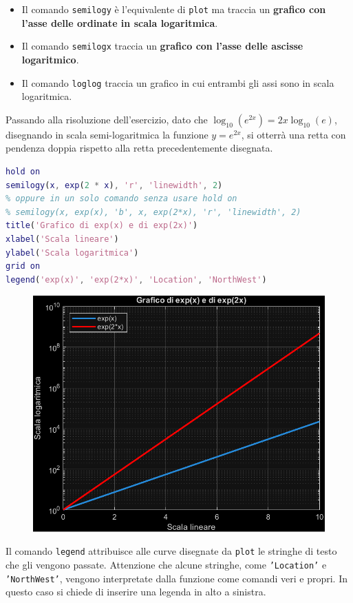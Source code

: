 \begin{itemize}
    \item Il comando \texttt{semilogy} è l'equivalente di \texttt{plot} ma traccia un \textbf{grafico con l'asse delle ordinate in scala logaritmica}.

    \item Il comando \texttt{semilogx} traccia un \textbf{grafico con l'asse delle ascisse logaritmico}.
    
    \item Il comando \texttt{loglog} traccia un grafico in cui entrambi gli assi sono in scala logaritmica.
\end{itemize}
Passando alla risoluzione dell'esercizio, dato che $\log_{10}\left(e^{2x}\right) = 2x\log_{10}\left(e\right)$, disegnando in scala semi-logaritmica la funzione $y = e^{2x}$, si otterrà una retta con pendenza doppia rispetto alla retta precedentemente disegnata.
\begin{lstlisting}[language=MATLAB]
hold on
semilogy(x, exp(2 * x), 'r', 'linewidth', 2)
% oppure in un solo comando senza usare hold on
% semilogy(x, exp(x), 'b', x, exp(2*x), 'r', 'linewidth', 2)
title('Grafico di exp(x) e di exp(2x)')
xlabel('Scala lineare')
ylabel('Scala logaritmica')
grid on
legend('exp(x)', 'exp(2*x)', 'Location', 'NorthWest')\end{lstlisting}
\begin{figure}[!htp]
    \centering
    \includegraphics[width=.7\textwidth]{img/grafici-di-funzione-5.pdf}
\end{figure}

\noindent
Il comando \texttt{legend} attribuisce alle curve disegnate da \texttt{plot} le stringhe di testo che gli vengono passate. Attenzione che alcune stringhe, come \texttt{'Location'} e \texttt{'NorthWest'}, vengono interpretate dalla funzione come comandi veri e propri. In questo caso si chiede di inserire una legenda in alto a sinistra.